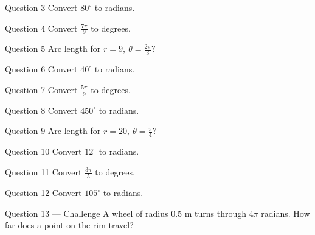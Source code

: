 \documentclass[11pt]{article}
\begin{document}
\begin{qbox}{Question 3}
Convert $80^\circ$ to radians.\workspace{2.4cm}
\end{qbox}

\begin{qbox}{Question 4}
Convert $\tfrac{7\pi}{9}$ to degrees.\workspace{2.4cm}
\end{qbox}

\begin{qbox}{Question 5}
Arc length for $r=9,\ \theta=\tfrac{2\pi}{3}$?\workspace{2.4cm}
\end{qbox}

\begin{qbox}{Question 6}
Convert $40^\circ$ to radians.\workspace{2.4cm}
\end{qbox}

\begin{qbox}{Question 7}
Convert $\tfrac{5\pi}{9}$ to degrees.\workspace{2.4cm}
\end{qbox}

\begin{qbox}{Question 8}
Convert $450^\circ$ to radians.\workspace{2.4cm}
\end{qbox}

\begin{qbox}{Question 9}
Arc length for $r=20,\ \theta=\tfrac{\pi}{4}$?\workspace{2.4cm}
\end{qbox}

\begin{qbox}{Question 10}
Convert $12^\circ$ to radians.\workspace{2.4cm}
\end{qbox}

\begin{qbox}{Question 11}
Convert $\tfrac{3\pi}{5}$ to degrees.\workspace{2.4cm}
\end{qbox}

\begin{qbox}{Question 12}
Convert $105^\circ$ to radians.\workspace{2.4cm}
\end{qbox}

\begin{qbox}{Question 13 --- Challenge}
A wheel of radius 0.5 m turns through $4\pi$ radians. How far does a point on the rim travel?\workspace{3cm}
\end{qbox}

\clearpage
{}
\end{document}

